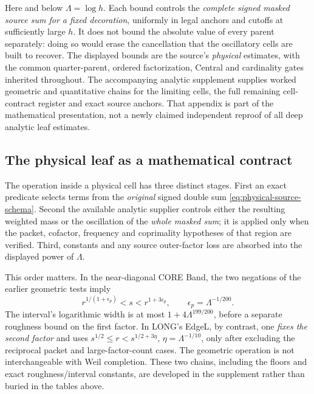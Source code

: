 \documentclass[11pt]{article}
\theoremstyle{definition}
\theoremstyle{remark}
\newcommand{\1}{\mathbf 1}
\begin{document}
Here and below $\Lambda=\log h$. Each bound controls the
\emph{complete signed masked source sum for a fixed decoration},
uniformly in legal anchors and cutoffs at sufficiently large $h$.
It does not bound the absolute value of every parent separately:
doing so would erase the cancellation that the oscillatory cells
are built to recover. The displayed bounds are the source's \emph{physical} estimates,
with the common quarter-parent, ordered factorization, Central
and cardinality gates inherited throughout. The accompanying
analytic supplement supplies worked geometric and quantitative
chains for the limiting cells, the full remaining cell-contract
register and exact source anchors. That appendix is part of the
mathematical presentation, not a newly claimed independent
reproof of all deep analytic leaf estimates.

\subsection{The physical leaf as a mathematical contract}
\label{sec:leaf-contract}

The operation inside a physical cell has three distinct stages.
First an exact predicate selects terms from the \emph{original}
signed double sum \eqref{eq:physical-source-schema}. Second the
available analytic supplier controls either the resulting
weighted mass or the oscillation of the \emph{whole masked sum};
it is applied only when the packet, cofactor, frequency and
coprimality hypotheses of that region are verified. Third,
constants and any source outer-factor loss are absorbed into
the displayed power of $\Lambda$.

This order matters. In the near-diagonal CORE Band, the two
negations of the earlier geometric tests imply
\begin{equation}\label{eq:band-interval-paper}
 r^{1/(1+\epsilon_p)}<s<r^{1+3\epsilon_p},
 \qquad\epsilon_p=\Lambda^{-1/200}.
\end{equation}
The interval's logarithmic width is at most
$1+4\Lambda^{199/200}$, before a separate roughness bound
on the first factor. In LONG's EdgeL, by contrast, one
\emph{fixes the second factor} and uses
$s^{1/2}\le r<s^{1/2+3\eta}$, $\eta=\Lambda^{-1/10}$,
only after excluding the reciprocal packet and large-factor-count
cases. The geometric operation is not interchangeable with
Weil completion. These two chains, including the floors and
exact roughness/interval constants, are developed in the
supplement rather than buried in the tables above.
\end{document}
